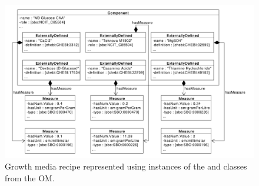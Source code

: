 \begin{figure}[ht]
\begin{center}
\includegraphics[width=\linewidth]{uml/media_example}
\caption[]{Growth media recipe represented using instances of the  and  classes from the OM.}
\label{uml:media_example}
\end{center}
\end{figure}
